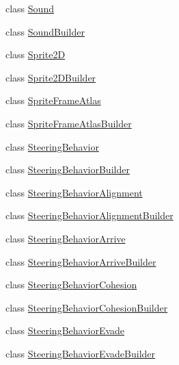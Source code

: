 \begin{DoxyCompactItemize}
\item 
class \mbox{\hyperlink{classnjli_1_1_world_factory_a50914f77c7cf4fb97616c898c5291f4b}{Sound}}
\item 
class \mbox{\hyperlink{classnjli_1_1_world_factory_ae2f1c8c3b6e1df88a207c6189f601fce}{Sound\+Builder}}
\item 
class \mbox{\hyperlink{classnjli_1_1_world_factory_ac1e5ab02d2359e991783010c562791e4}{Sprite2D}}
\item 
class \mbox{\hyperlink{classnjli_1_1_world_factory_a426536e3f63ba8c46a268e2fc01dc6d8}{Sprite2\+D\+Builder}}
\item 
class \mbox{\hyperlink{classnjli_1_1_world_factory_a83269c8e3483e24989223393adfe4cc2}{Sprite\+Frame\+Atlas}}
\item 
class \mbox{\hyperlink{classnjli_1_1_world_factory_a9a77a7ee21b233ff37780fdba5ff2655}{Sprite\+Frame\+Atlas\+Builder}}
\item 
class \mbox{\hyperlink{classnjli_1_1_world_factory_ad5ca69736262ac0a4426bf1db26782c0}{Steering\+Behavior}}
\item 
class \mbox{\hyperlink{classnjli_1_1_world_factory_a331a672189b9f56521adf39cc0817dda}{Steering\+Behavior\+Builder}}
\item 
class \mbox{\hyperlink{classnjli_1_1_world_factory_a91f44afa8cf5820363fcba6eea3f4b2e}{Steering\+Behavior\+Alignment}}
\item 
class \mbox{\hyperlink{classnjli_1_1_world_factory_adf57a6be2aac43ce9580d621186471d7}{Steering\+Behavior\+Alignment\+Builder}}
\item 
class \mbox{\hyperlink{classnjli_1_1_world_factory_a8f0655358bab63860fdd0b8556b03474}{Steering\+Behavior\+Arrive}}
\item 
class \mbox{\hyperlink{classnjli_1_1_world_factory_ab36977bc87279e54b2d2ef998a03feed}{Steering\+Behavior\+Arrive\+Builder}}
\item 
class \mbox{\hyperlink{classnjli_1_1_world_factory_af0dc08bdc007e78d18eb2917a1156f36}{Steering\+Behavior\+Cohesion}}
\item 
class \mbox{\hyperlink{classnjli_1_1_world_factory_a8b6634ffab3c50f822b0c2532e0a4e0d}{Steering\+Behavior\+Cohesion\+Builder}}
\item 
class \mbox{\hyperlink{classnjli_1_1_world_factory_a5ad7aa81fd7daa690f8bc3463ce6f1ab}{Steering\+Behavior\+Evade}}
\item 
class \mbox{\hyperlink{classnjli_1_1_world_factory_a74e13c4f0e41e02b705eb9bdb76d0d1b}{Steering\+Behavior\+Evade\+Builder}}
\item 

\end{DoxyCompactItemize}
